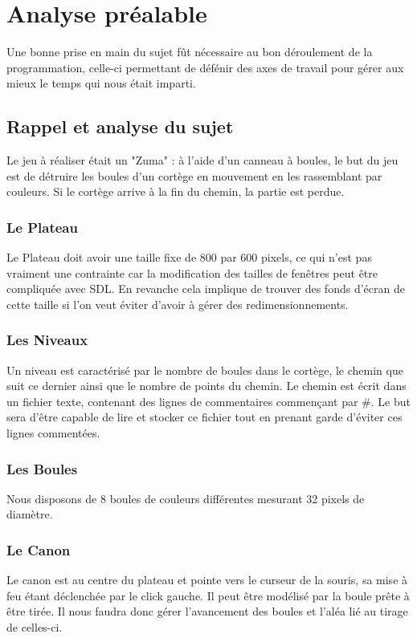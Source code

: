 \section{Analyse préalable}
Une bonne prise en main du sujet fût nécessaire au bon déroulement de la programmation, celle-ci permettant 
de défénir des axes de travail pour gérer aux mieux le temps qui nous était imparti.
\subsection{Rappel et analyse du sujet}

Le jeu à réaliser était un "Zuma" : à l'aide d'un canneau à boules, le but du jeu est de détruire les boules d'un cortège 
en mouvement en les rassemblant par couleurs. Si le cortège arrive à la fin du chemin, la partie est perdue.
\subsubsection{Le Plateau}
Le Plateau doit avoir une taille fixe de 800 par 600 pixels, ce qui n'est pas vraiment une contrainte car la modification des tailles de fenêtres peut être compliquée avec SDL. En revanche cela implique de trouver des fonds d'écran de cette taille si l'on veut éviter d'avoir à gérer des redimensionnements.

\subsubsection{Les Niveaux}

Un niveau est caractérisé par le nombre de boules dans le cortège, le chemin que suit ce dernier ainsi que le nombre de points du chemin.
Le chemin est écrit dans un fichier texte, contenant des lignes de commentaires commençant par \#. Le but sera d'être capable de lire et stocker ce fichier tout en prenant garde d'éviter ces lignes commentées.

\subsubsection{Les Boules}

Nous disposons de 8 boules de couleurs différentes mesurant 32 pixels de diamètre.

\subsubsection{Le Canon} 

Le canon est au centre du plateau et pointe vers le curseur de la souris, sa mise à feu étant déclenchée par le click gauche.
Il peut être modélisé par la boule prête à être tirée. Il nous faudra donc gérer l'avancement des boules et l'aléa lié au tirage de celles-ci.

